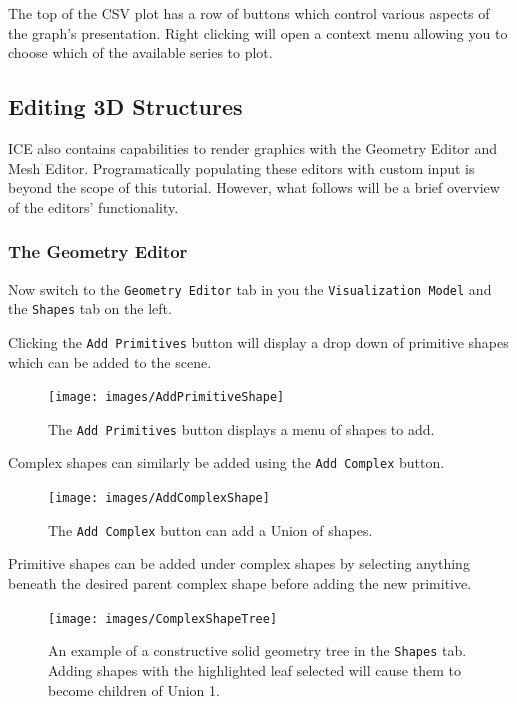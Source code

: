 The top of the CSV plot has a row of buttons which control various aspects of
the graph's presentation. Right clicking will open a context menu allowing you
to choose which of the available series to plot.

\subsection{Editing 3D Structures}

ICE also contains capabilities to render graphics with the Geometry Editor and
Mesh Editor. Programatically populating these editors with custom input is
beyond the scope of this tutorial. However, what follows will be a brief
overview of the editors' functionality.

\subsubsection{The Geometry Editor}

Now switch to the \texttt{Geometry Editor} tab in you the \texttt{Visualization
Model} and the \texttt{Shapes} tab on the left.

Clicking the \texttt{Add Primitives} button will display a drop down of
primitive shapes which can be added to the scene.

\begin{figure}[!h]
\texttt{[image: images/AddPrimitiveShape]}
\centering
\caption{The \texttt{Add Primitives} button displays a menu of shapes to add.}
\label{fig:addprimitiveshape}
\end{figure}

Complex shapes can similarly be added using the \texttt{Add Complex} button.

\begin{figure}[!h]
\texttt{[image: images/AddComplexShape]}
\centering
\caption{The \texttt{Add Complex} button can add a Union of shapes.}
\label{fig:addcomplexshape}
\end{figure}

Primitive shapes can be added under complex shapes by selecting anything beneath
the desired parent complex shape before adding the new primitive.

\begin{figure}[!h]
\texttt{[image: images/ComplexShapeTree]}
\centering
\caption{An example of a constructive solid geometry tree in the
\texttt{Shapes} tab. Adding shapes with the highlighted leaf selected will
cause them to become children of Union 1.}
\label{fig:complexshapetree}
\end{figure}

